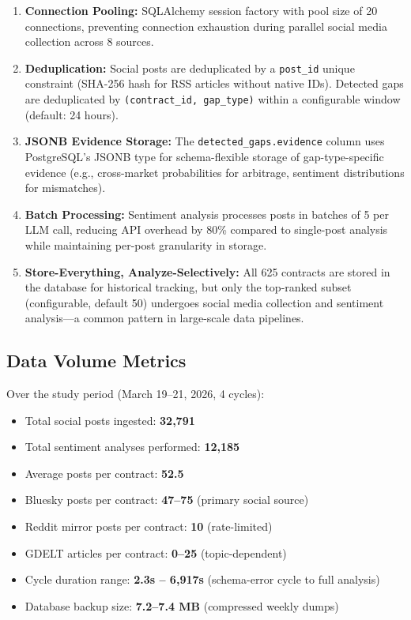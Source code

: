 \documentclass[12pt, letterpaper]{article}
\begin{document}
\begin{enumerate}
    \item \textbf{Connection Pooling:} SQLAlchemy session factory with pool size of 20 connections, preventing connection exhaustion during parallel social media collection across 8 sources.

    \item \textbf{Deduplication:} Social posts are deduplicated by a \texttt{post\_id} unique constraint (SHA-256 hash for RSS articles without native IDs). Detected gaps are deduplicated by \texttt{(contract\_id, gap\_type)} within a configurable window (default: 24 hours).

    \item \textbf{JSONB Evidence Storage:} The \texttt{detected\_gaps.evidence} column uses PostgreSQL's JSONB type for schema-flexible storage of gap-type-specific evidence (e.g., cross-market probabilities for arbitrage, sentiment distributions for mismatches).

    \item \textbf{Batch Processing:} Sentiment analysis processes posts in batches of 5 per LLM call, reducing API overhead by 80\% compared to single-post analysis while maintaining per-post granularity in storage.

    \item \textbf{Store-Everything, Analyze-Selectively:} All 625 contracts are stored in the database for historical tracking, but only the top-ranked subset (configurable, default 50) undergoes social media collection and sentiment analysis---a common pattern in large-scale data pipelines.
\end{enumerate}

\subsection{Data Volume Metrics}

Over the study period (March 19--21, 2026, 4 cycles):

\begin{itemize}
    \item Total social posts ingested: \textbf{32,791}
    \item Total sentiment analyses performed: \textbf{12,185}
    \item Average posts per contract: \textbf{52.5}
    \item Bluesky posts per contract: \textbf{47--75} (primary social source)
    \item Reddit mirror posts per contract: \textbf{10} (rate-limited)
    \item GDELT articles per contract: \textbf{0--25} (topic-dependent)
    \item Cycle duration range: \textbf{2.3s -- 6,917s} (schema-error cycle to full analysis)
    \item Database backup size: \textbf{7.2--7.4 MB} (compressed weekly dumps)
\end{itemize}
\end{document}
